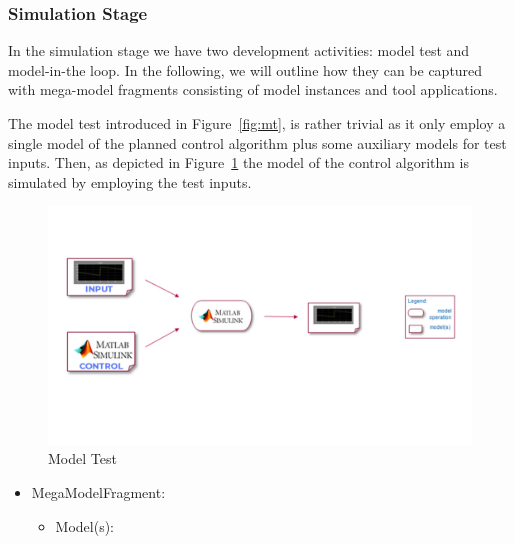 \subsubsection{Simulation Stage}
%
In the simulation stage we have two development activities: model test and model-in-the loop.
%
In the following, we will outline how they can be captured with mega-model fragments consisting of model instances and tool applications.





%
The model test introduced in Figure~\ref{fig:mt}, is rather trivial as it only employ a single model of the planned control algorithm plus some auxiliary models for test inputs. Then, as depicted in Figure~\ref{fig:MMFig3} the model of the control algorithm is simulated by employing the test inputs.

\begin{figure}[!htb]
\centering
\includegraphics[scale=0.33]{figures/mm-hpi3.pdf}
\caption{Model Test}
\label{fig:MMFig3}
\vspace{-0.2in}
\end{figure}

%
%

\begin{itemize}
    \item MegaModelFragment: \CPSLabMTMMF
    \begin{itemize}
        \item Model(s): \CPSLabControlModel
    \end{itemize}
\end{itemize}

